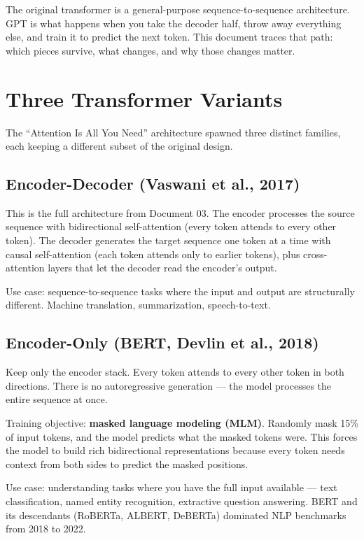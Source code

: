 


The original transformer is a general-purpose sequence-to-sequence architecture. GPT is what happens when you take the decoder half, throw away everything else, and train it to predict the next token. This document traces that path: which pieces survive, what changes, and why those changes matter.

\section{Three Transformer Variants}

The ``Attention Is All You Need'' architecture spawned three distinct families, each keeping a different subset of the original design.

\subsection{Encoder-Decoder (Vaswani et al., 2017)}

This is the full architecture from Document 03. The encoder processes the source sequence with bidirectional self-attention (every token attends to every other token). The decoder generates the target sequence one token at a time with causal self-attention (each token attends only to earlier tokens), plus cross-attention layers that let the decoder read the encoder's output.

Use case: sequence-to-sequence tasks where the input and output are structurally different. Machine translation, summarization, speech-to-text.

\subsection{Encoder-Only (BERT, Devlin et al., 2018)}

Keep only the encoder stack. Every token attends to every other token in both directions. There is no autoregressive generation --- the model processes the entire sequence at once.

Training objective: \textbf{masked language modeling (MLM)}. Randomly mask 15\% of input tokens, and the model predicts what the masked tokens were. This forces the model to build rich bidirectional representations because every token needs context from both sides to predict the masked positions.

Use case: understanding tasks where you have the full input available --- text classification, named entity recognition, extractive question answering. BERT and its descendants (RoBERTa, ALBERT, DeBERTa) dominated NLP benchmarks from 2018 to 2022.

